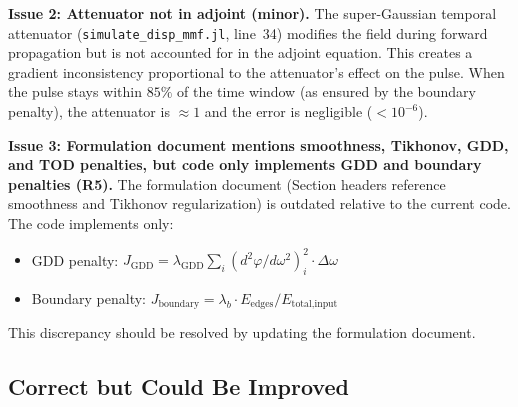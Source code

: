 \documentclass[12pt,a4paper]{article}
\theoremstyle{definition}
\begin{document}
\begin{flagged}
\textbf{Issue 2: Attenuator not in adjoint (minor).} The super-Gaussian temporal attenuator (\texttt{simulate\_disp\_mmf.jl}, line~34) modifies the field during forward propagation but is not accounted for in the adjoint equation. This creates a gradient inconsistency proportional to the attenuator's effect on the pulse. When the pulse stays within $85\%$ of the time window (as ensured by the boundary penalty), the attenuator is $\approx 1$ and the error is negligible ($< 10^{-6}$).
\end{flagged}

\begin{flagged}
\textbf{Issue 3: Formulation document mentions smoothness, Tikhonov, GDD, and TOD penalties, but code only implements GDD and boundary penalties (R5).} The formulation document (Section headers reference smoothness and Tikhonov regularization) is outdated relative to the current code. The code implements only:
\begin{itemize}
\item GDD penalty: $J_{\text{GDD}} = \lambda_{\text{GDD}} \sum_i (d^2\varphi/d\omega^2)_i^2 \cdot \Delta\omega$
\item Boundary penalty: $J_{\text{boundary}} = \lambda_b \cdot E_{\text{edges}}/E_{\text{total,input}}$
\end{itemize}
This discrepancy should be resolved by updating the formulation document.
\end{flagged}

\subsection{Correct but Could Be Improved}
\end{document}
